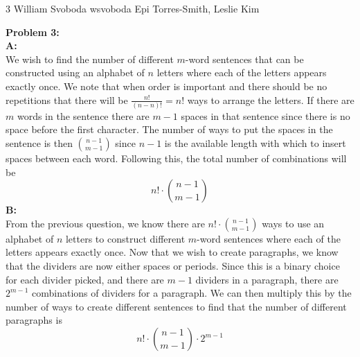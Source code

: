 \documentclass[12pt,letterpaper]{cos340hw}
\begin{document}
           {3}            %
           {William Svoboda}  %
           {wsvoboda}   %
           {Epi Torres-Smith, Leslie Kim} 




\noindent\textbf{Problem 3:}\\
\noindent\textbf{A:}\\
We wish to find the number of different $m$-word sentences that can be constructed using an alphabet
of $n$ letters where each of the letters appears exactly once. We note that when order is important and 
there should be no repetitions that there will be $\frac{n!}{(n-n)!}=n!$ ways to arrange the letters. If there 
are $m$ words in the sentence there are $m-1$ spaces in that sentence since there is no space before the first character. 
The number of ways to put the spaces in the sentence is then $\binom{n-1}{m-1}$ since $n-1$ is the available length with 
which to insert spaces between each word. Following this, the total number of combinations will be 
$$n!\cdot\binom{n-1}{m-1}$$
\noindent\textbf{B:}\\
From the previous question, we know there are $n!\cdot\binom{n-1}{m-1}$ ways to use an alphabet
of $n$ letters to construct different $m$-word sentences where each of the letters appears exactly once. Now 
that we wish to create paragraphs, we know that the dividers are now either spaces or periods. Since this is a binary
choice for each divider picked, and there are $m-1$ dividers in a paragraph, there are $2^{m-1}$ combinations of dividers
for a paragraph. We can then multiply this by the number of ways to create different sentences to find that the number of
different paragraphs is
$$n!\cdot\binom{n-1}{m-1}\cdot2^{m-1}$$

\end{document}
